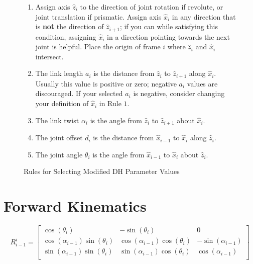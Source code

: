 \documentclass[
  letterpaper,
  DIV=11,
  numbers=noendperiod]{scrreprt}
\providecommand{\tightlist}{%
  \setlength{\itemsep}{0pt}\setlength{\parskip}{0pt}}\usepackage{longtable,booktabs,array}
\begin{document}
\begin{figure}

{\centering 

\begin{enumerate}
\def\labelenumi{\arabic{enumi}.}
\tightlist
\item
  Assign axis \(\hat{z}_i\) to the direction of joint rotation if
  revolute, or joint translation if prismatic. Assign axis \(\hat{x}_i\)
  in any direction that is \textbf{not} the direction of
  \(\hat{z}_{i+1}\); if you can while satisfying this condition,
  assigning \(\hat{x}_i\) in a direction pointing towards the next joint
  is helpful. Place the origin of frame \(i\) where \(\hat{z}_i\) and
  \(\hat{x}_i\) intersect.
\item
  The link length \(a_{i}\) is the distance from \(\hat{z}_i\) to
  \(\hat{z}_{i+1}\) along \(\hat{x}_i\). Usually this value is positive
  or zero; negative \(a_i\) values are discouraged. If your selected
  \(a_i\) is negative, consider changing your definition of
  \(\hat{x}_i\) in Rule \(1\).
\item
  The link twist \(\alpha_{i}\) is the angle from \(\hat{z}_i\) to
  \(\hat{z}_{i+1}\) about \(\hat{x}_i\).
\item
  The joint offset \(d_{i}\) is the distance from \(\hat{x}_{i-1}\) to
  \(\hat{x}_{i}\) along \(\hat{z}_{i}\).
\item
  The joint angle \(\theta_{i}\) is the angle from \(\hat{x}_{i-1}\) to
  \(\hat{x}_{i}\) about \(\hat{z}_{i}\).
\end{enumerate}

}

\caption{\label{fig-mdh-rules}Rules for Selecting Modified DH Parameter
Values}

\end{figure}

\hypertarget{forward-kinematics-1}{%
\section{Forward Kinematics}\label{forward-kinematics-1}}

$$ \begin{equation}
R^i_{i - 1} = \left[
\begin{array}{ccc}
\cos\left( \theta_i \right) &  - \sin\left( \theta_i \right) & 0 \\
\cos\left( \alpha_{i - 1} \right) \sin\left( \theta_i \right) & \cos\left( \alpha_{i - 1} \right) \cos\left( \theta_i \right) &  - \sin\left( \alpha_{i - 1} \right) \\
\sin\left( \alpha_{i - 1} \right) \sin\left( \theta_i \right) & \sin\left( \alpha_{i - 1} \right) \cos\left( \theta_i \right) & \cos\left( \alpha_{i - 1} \right) \\
\end{array}
\right]
\end{equation}
 $$
\end{document}
